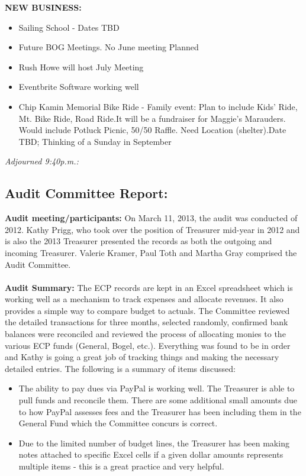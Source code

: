 \documentclass[10pt,a4paper]{article}
\newcommand\subsect[1]{%
  \subsection*{#1}%
  \addcontentsline{toc}{subsection}{#1}}
\begin{document}
\begin{multicols}{2}
\textbf{NEW BUSINESS:}
\begin{itemize}
\item Sailing School - Dates TBD 
\item Future BOG Meetings. No June meeting Planned
\item Rush Howe will host July Meeting
\item Eventbrite Software working well
\item Chip Kamin Memorial Bike Ride - Family event:  Plan to include Kids' Ride, Mt. Bike Ride, Road Ride.It will be a fundraiser for Maggie's Marauders. Would include Potluck Picnic, 50/50 Raffle. Need Location (shelter).Date TBD;  Thinking of a Sunday in September
\end{itemize}

\textit{Adjourned 9:40p.m.:}

\subsect{Audit Committee Report:}

\textbf{Audit meeting/participants:}  On March 11, 2013, the audit was conducted of 2012.  Kathy Prigg, who took over the position of Treasurer mid-year in 2012 and is also the 2013 Treasurer presented the records as both the outgoing and incoming Treasurer.  Valerie Kramer, Paul Toth and Martha Gray comprised the Audit Committee.
\\
\\
\textbf{Audit Summary:}  The ECP records are kept in an Excel spreadsheet which is working well as a mechanism to track expenses and allocate revenues.  It also provides a simple way to compare budget to actuals. The Committee reviewed the detailed transactions for three months, selected randomly, confirmed bank balances were reconciled and reviewed the process of allocating monies to the various ECP funds (General, Bogel, etc.).  Everything was found to be in order and Kathy is going a great job of tracking things and making the necessary detailed entries.  The following is a summary of items discussed:

\begin{itemize}
\item The ability to pay dues via PayPal is working well.  The Treasurer is able to pull funds and reconcile them.  There are some additional small amounts due to how PayPal assesses fees and the Treasurer has been including them in the General Fund which the Committee concurs is correct.

\item Due to the limited number of budget lines, the Treasurer has been making notes attached to specific Excel cells if a given dollar amounts represents multiple items - this is a great practice and very helpful.


\end{itemize}
\end{multicols}
\end{document}
